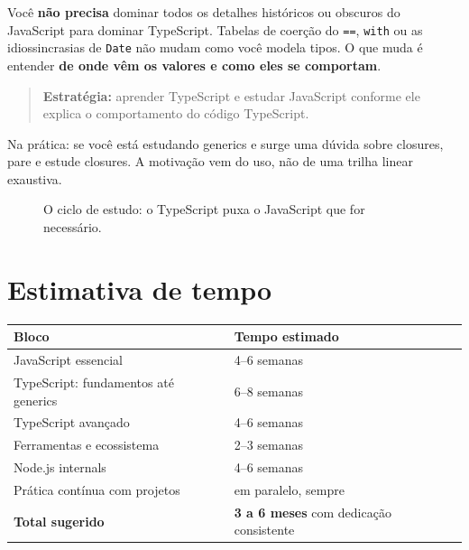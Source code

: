 \documentclass[12pt,a4paper,oneside]{book}
\newcommand{\code}[1]{\texttt{#1}}
\begin{document}
Você \textbf{não precisa} dominar todos os detalhes históricos ou obscuros do JavaScript para dominar TypeScript. Tabelas de coerção do \code{==}, \code{with} ou as idiossincrasias de \code{Date} não mudam como você modela tipos. O que muda é entender \textbf{de onde vêm os valores e como eles se comportam}.

\begin{quote}
\textbf{Estratégia:} aprender TypeScript e estudar JavaScript conforme ele explica o comportamento do código TypeScript.
\end{quote}

Na prática: se você está estudando generics e surge uma dúvida sobre closures, pare e estude closures. A motivação vem do uso, não de uma trilha linear exaustiva.

\begin{figure}[h]
\centering
{}
\caption{O ciclo de estudo: o TypeScript puxa o JavaScript que for necessário.}
\end{figure}

\section{Estimativa de tempo}

\begin{center}
\begin{tabular}{@{}ll@{}}
\toprule
\textbf{Bloco} & \textbf{Tempo estimado} \\
\midrule
JavaScript essencial & 4--6 semanas \\
TypeScript: fundamentos até generics & 6--8 semanas \\
TypeScript avançado & 4--6 semanas \\
Ferramentas e ecossistema & 2--3 semanas \\
Node.js internals & 4--6 semanas \\
Prática contínua com projetos & em paralelo, sempre \\
\midrule
\textbf{Total sugerido} & \textbf{3 a 6 meses} com dedicação consistente \\
\bottomrule
\end{tabular}
\end{center}
\end{document}
